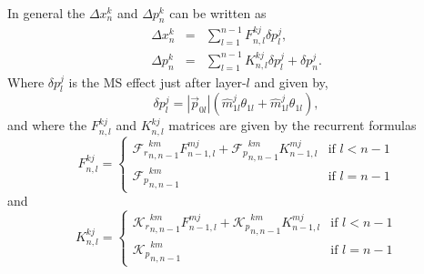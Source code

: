 ~\\
\noindent
In general the $\Delta x^{k}_{n}$ and $\Delta p^{k}_{n}$ can be written as
\begin{eqnarray}
  \Delta x^{k}_{n} &=& \sum^{n-1}_{l = 1} F^{kj}_{n,l} \delta p^{j}_{l}, \\
  \Delta p^{k}_{n} &=& \sum^{n-1}_{l = 1} K^{kj}_{n,l} \delta p^{j}_{l} + \delta p^{j}_{n}.
\end{eqnarray}
\noindent
Where $\delta p^{j}_{l}$ is the MS effect just after layer-$l$ and given by,
\begin{equation}
  \delta p^{j}_{l} = |\vec{p}_{0l}|(\hat{m}^{j}_{1l}\theta_{1l} + \hat{m}^{j}_{1l}\theta_{1l}),
\end{equation}
\noindent
and where the $F^{kj}_{n,l}$ and $K^{kj}_{n,l}$ matrices are given by the recurrent formulas
\begin{equation}
  F^{kj}_{n,l} = \left\{
  \begin{array}{ll}
    {\mathcal F_{r}}^{km}_{n,n-1} F^{mj}_{n-1,l} + {\mathcal F_{p}}^{km}_{n,n-1} K^{mj}_{n-1,l} & \mbox{if } l < n-1 \\
    {\mathcal F_{p}}^{km}_{n,n-1}                                                               & \mbox{if } l = n-1
   \end{array}
  \right.
\end{equation}
\noindent
and 
\begin{equation}
  K^{kj}_{n,l} = \left\{
  \begin{array}{ll}
    {\mathcal K_{r}}^{km}_{n,n-1} F^{mj}_{n-1,l} + {\mathcal K_{p}}^{km}_{n,n-1} K^{mj}_{n-1,l} & \mbox{if } l < n-1 \\
    {\mathcal K_{p}}^{km}_{n,n-1}                                                               & \mbox{if } l = n-1
   \end{array}
  \right.
\end{equation}

